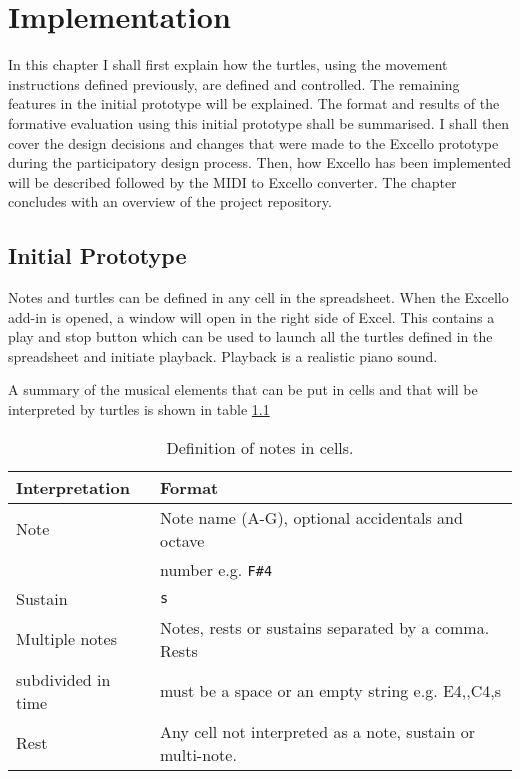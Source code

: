 \chapter{Implementation}

In this chapter I shall first explain how the turtles, using the movement instructions defined previously, are defined and controlled. The remaining features in the initial prototype will be explained. The format and results of the formative evaluation using this initial prototype shall be summarised. I shall then cover the design decisions and changes that were made to the Excello prototype during the participatory design process. Then, how Excello has been implemented will be described followed by the MIDI to Excello converter. The chapter concludes with an overview of the project repository.

\section{Initial Prototype}

Notes and turtles can be defined in any cell in the spreadsheet. When the Excello add-in is opened, a window will open in the right side of Excel. This contains a play and stop button which can be used to launch all the turtles defined in the spreadsheet and initiate playback. Playback is a realistic piano sound.

A summary of the musical elements that can be put in cells and that will be interpreted by turtles is shown in table \ref{tab:cells}

\begin{table}
\centering
\caption{Definition of notes in cells.}
\begin{tabular}{|l|l|} \hline
\textbf{Interpretation}&\textbf{Format}\\ \hline
Note& Note name (A-G), optional accidentals and octave \\
&number e.g. \texttt{F\#4}\\ \hline
Sustain& \texttt{s}\\ \hline
Multiple notes& Notes, rests or sustains separated by a comma. Rests \\
subdivided in time& must be a space or an empty string e.g. E4,,C4,s\\ \hline
Rest& Any cell not interpreted as a note, sustain or multi-note. \\ \hline
\end{tabular}
\label{tab:cells}
\end{table}

